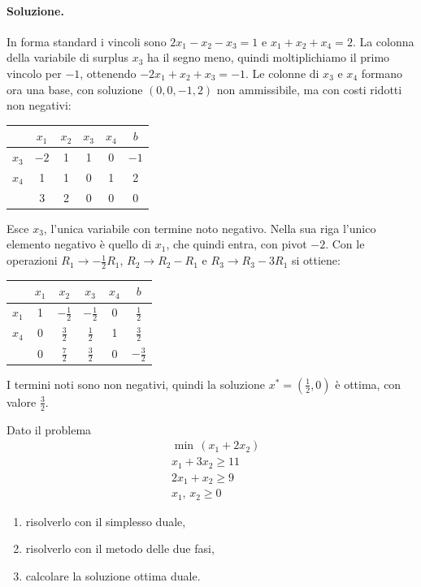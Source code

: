 \paragraph{Soluzione.}
In forma standard i vincoli sono $2x_1 - x_2 - x_3 = 1$ e $x_1 + x_2 + x_4 = 2$. La colonna della variabile di surplus $x_3$ ha il segno meno, quindi moltiplichiamo il primo vincolo per $-1$, ottenendo $-2x_1 + x_2 + x_3 = -1$. Le colonne di $x_3$ e $x_4$ formano ora una base, con soluzione $(0, 0, -1, 2)$ non ammissibile, ma con costi ridotti non negativi:
\begin{center}
\begin{tabular}{c|cccc|c}
 & $x_1$ & $x_2$ & $x_3$ & $x_4$ & $b$ \\
\hline
$x_3$ & $\boxed{-2}$ & 1 & 1 & 0 & $-1$ \\
$x_4$ & 1 & 1 & 0 & 1 & 2 \\
\hline
 & 3 & 2 & 0 & 0 & 0 \\
\end{tabular}
\end{center}
Esce $x_3$, l'unica variabile con termine noto negativo. Nella sua riga l'unico elemento negativo è quello di $x_1$, che quindi entra, con pivot $-2$. Con le operazioni $R_1 \to -\frac12 R_1$, $R_2 \to R_2 - R_1$ e $R_3 \to R_3 - 3R_1$ si ottiene:
\begin{center}
\begin{tabular}{c|cccc|c}
 & $x_1$ & $x_2$ & $x_3$ & $x_4$ & $b$ \\
\hline
$x_1$ & 1 & $-\frac12$ & $-\frac12$ & 0 & $\frac12$ \\
$x_4$ & 0 & $\frac32$ & $\frac12$ & 1 & $\frac32$ \\
\hline
 & 0 & $\frac72$ & $\frac32$ & 0 & $-\frac32$ \\
\end{tabular}
\end{center}
I termini noti sono non negativi, quindi la soluzione $x^* = (\frac12, 0)$ è ottima, con valore $\frac32$.

\begin{esercizio}
Dato il problema
\[
\begin{aligned}
&\min\, (x_1 + 2x_2) \\
&x_1 + 3x_2 \ge 11 \\
&2x_1 + x_2 \ge 9 \\
&x_1,\, x_2 \ge 0
\end{aligned}
\]
\begin{enumerate}[label=\alph*)]
    \item risolverlo con il simplesso duale,
    \item risolverlo con il metodo delle due fasi,
    \item calcolare la soluzione ottima duale.
\end{enumerate}
\end{esercizio}

